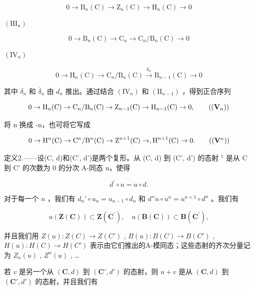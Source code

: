 \[
0 \longrightarrow \mathrm{B} _ {n} (\mathrm{C}) \longrightarrow \mathrm{Z} _ {n} (\mathrm{C}) \longrightarrow \mathrm{H} _ {n} (\mathrm{C}) \longrightarrow 0
\]

\((\mathrm{III}_{n})\)

\[
0 \longrightarrow \mathrm{B} _ {n} (\mathrm{C}) \longrightarrow \mathrm{C} _ {n} \longrightarrow \mathrm{C} _ {n} / \mathrm{B} _ {n} (\mathrm{C}) \longrightarrow 0
\]

\((\mathrm{IV}_n)\)

\[
0 \longrightarrow \mathrm{H} _ {n} (\mathrm{C}) \longrightarrow \mathrm{C} _ {n} / \mathrm{B} _ {n} (\mathrm{C}) \stackrel {\overline {{\delta}} _ {n}} {\longrightarrow} \mathrm{B} _ {n - 1} (\mathrm{C}) \longrightarrow 0
\]

其中 \(\delta_{n}\) 和 \(\overline{\delta}_{n}\) 由 \(d_{n}\) 推出。通过结合 \((\mathrm{IV}_{n})\) 和 \((\mathrm{II}_{n-1})\) ，得到正合序列

\[
0 \rightarrow \mathrm{H} _ {n} (\mathrm{C}) \rightarrow \mathrm{C} _ {n} / \mathrm{B} _ {n} (\mathrm{C}) \rightarrow \mathrm{Z} _ {n - 1} (\mathrm{C}) \rightarrow \mathrm{H} _ {n - 1} (\mathrm{C}) \rightarrow 0,\tag{\((\mathbf{V}_n)\)}
\]

将 n 换成 -n，也可将它写成

\[
0 \rightarrow \mathrm{H} ^ {n} (\mathrm{C}) \rightarrow \mathrm{C} ^ {n} / \mathrm{B} ^ {n} (\mathrm{C}) \rightarrow \mathrm{Z} ^ {n + 1} (\mathrm{C}) \rightarrow , \mathrm{H} ^ {n + 1} (\mathrm{C}) \rightarrow 0.\tag{\((\mathbf{V}^n)\)}
\]

定义2.——设(C, d)和(C', d')是两个复形。从 (C, d) 到 (C', d') 的态射 \(^{1}\) 是从 C 到 C' 的次数为 0 的分次 A-同态 u，使得

\[
d ^ {\prime} \circ u = u \circ d.
\]

对于每一个 \(n\) ，我们有 \(d_n' \circ u_n = u_{n-1} \circ d_n\) 和 \(d''n \circ u^n = u^{n+1} \circ d^n\) 。我们有

\[
u (\mathbf {Z} (\mathbf {C})) \subset \mathbf {Z} (\mathbf {C} ^ {\prime}), \quad u (\mathbf {B} (\mathbf {C})) \subset \mathbf {B} (\mathbf {C} ^ {\prime}),
\]

并且我们用 \(Z(u):Z(C)\to Z(C')\) , \(B(u):B(C)\to B(C')\) , \(H(u):H(C)\to H(C')\) 表示由它们推出的A-模同态；这些态射的齐次分量记为 \(Z_{n}(u)\) , \(Z^{n}(u)\) , \ldots{}

若 \(v\) 是另一个从 \((\mathbf{C}, d)\) 到 \((\mathbf{C}', d')\) 的态射，则 \(u + v\) 是从 \((\mathbf{C}, d)\) 到 \((\mathbf{C}', d')\) 的态射，并且我们有

